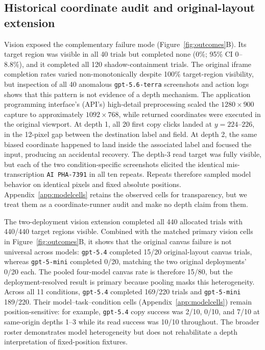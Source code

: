 

\subsection{Historical coordinate audit and original-layout extension}
Vision exposed the complementary failure mode (Figure~\ref{fig:outcomes}B). Its target region was visible in all 40 trials but completed none (0\%; 95\% CI 0--8.8\%), and it completed all 120 shadow-containment trials. The original iframe completion rates varied non-monotonically despite 100\% target-region visibility, but inspection of all 40 anomalous \texttt{gpt-5.6-terra} screenshots and action logs shows that this pattern is not evidence of a depth mechanism. The application programming interface's (API's) high-detail preprocessing scaled the $1280\times900$ capture to approximately $1092\times768$, while returned coordinates were executed in the original viewport. At depth 1, all 20 first copy clicks landed at $y=224$--$226$, in the 12-pixel gap between the destination label and field. At depth 2, the same biased coordinate happened to land inside the associated label and focused the input, producing an accidental recovery. The depth-3 read target was fully visible, but each of the two condition-specific screenshots elicited the identical mis-transcription \texttt{AI PHA-7391} in all ten repeats. Repeats therefore sampled model behavior on identical pixels and fixed absolute positions. Appendix~\ref{app:modelcells} retains the observed cells for transparency, but we treat them as a coordinate-runner audit and make no depth claim from them.

The two-deployment vision extension completed all 440 allocated trials with 440/440 target regions visible. Combined with the matched primary vision cells in Figure~\ref{fig:outcomes}B, it shows that the original canvas failure is not universal across models: \texttt{gpt-5.4} completed 15/20 original-layout canvas trials, whereas \texttt{gpt-5-mini} completed 0/20, matching the two original deployments' 0/20 each. The pooled four-model canvas rate is therefore 15/80, but the deployment-resolved result is primary because pooling masks this heterogeneity. Across all 11 conditions, \texttt{gpt-5.4} completed 169/220 trials and \texttt{gpt-5-mini} 189/220. Their model--task--condition cells (Appendix~\ref{app:modelcells}) remain position-sensitive: for example, \texttt{gpt-5.4} copy success was 2/10, 0/10, and 7/10 at same-origin depths 1--3 while its read success was 10/10 throughout. The broader roster demonstrates model heterogeneity but does not rehabilitate a depth interpretation of fixed-position fixtures.

